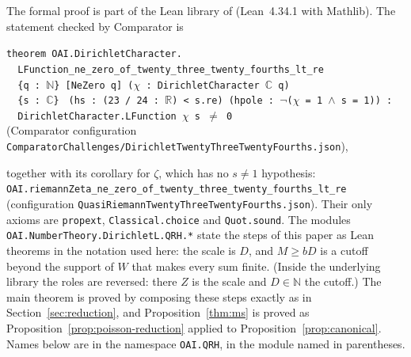 \documentclass[11pt,a4paper]{article}
\numberwithin{equation}{section}
\numberwithin{figure}{section}
\theoremstyle{definition}
\theoremstyle{remark}
\begin{document}
The formal proof is part of the Lean library of \cite{OpenAI26} (Lean~4.34.1 with Mathlib). The
statement checked by Comparator is
\begin{center}
\small
\texttt{theorem OAI.DirichletCharacter.}\\
\texttt{\ \ LFunction\_ne\_zero\_of\_twenty\_three\_twenty\_fourths\_lt\_re}\\
\texttt{\ \ \{q :\ }$\mathbb N$\texttt{\} [NeZero q] (}$\chi$\texttt{ :\ DirichletCharacter }$\mathbb C$\texttt{ q)}\\
\texttt{\ \ \{s :\ }$\mathbb C$\texttt{\}}
\texttt{ (hs :\ (23 / 24 :\ }$\mathbb R$\texttt{) < s.re) (hpole :\ }$\neg$\texttt{(}$\chi$\texttt{ = 1 }$\wedge$\texttt{ s = 1)) :}\\
\texttt{\ \ DirichletCharacter.LFunction }$\chi$\texttt{ s }$\ne$\texttt{ 0}\\[3pt]
(Comparator configuration \texttt{ComparatorChallenges/\allowbreak DirichletTwentyThreeTwentyFourths.json}),
\end{center}
together with its corollary for $\zeta$, which has no $s\ne1$ hypothesis:
\texttt{OAI.riemannZeta\_ne\_zero\_of\_\allowbreak twenty\_\allowbreak three\_\allowbreak twenty\_\allowbreak fourths\_\allowbreak lt\_\allowbreak re}
(configuration \texttt{Quasi\allowbreak Riemann\allowbreak Twenty\allowbreak Three\allowbreak Twenty\allowbreak Fourths.json}).
Their only axioms are \texttt{propext}, \texttt{Classical.choice} and \texttt{Quot.sound}. The
modules \texttt{OAI.NumberTheory.\allowbreak DirichletL.\allowbreak QRH.*} state the steps of this paper as Lean theorems
in the notation used here: the scale is $D$, and $M\ge bD$ is a cutoff beyond the support of $W$
that makes every sum finite. (Inside the underlying library the roles are reversed: there $Z$ is
the scale and $D\in\mathbb N$ the cutoff.) The main theorem is proved by composing these steps
exactly as in Section~\ref{sec:reduction}, and Proposition~\ref{thm:ms} is proved as
Proposition~\ref{prop:poisson-reduction} applied to Proposition~\ref{prop:canonical}. Names below
are in the namespace \texttt{OAI.QRH}, in the module named in parentheses.
\end{document}

